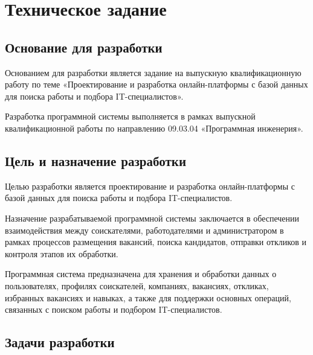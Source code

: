 \section{Техническое задание}
\subsection{Основание для разработки}

Основанием для разработки является задание на выпускную квалификационную работу по теме «Проектирование и разработка онлайн-платформы с базой данных для поиска работы и подбора IT-специалистов».

Разработка программной системы выполняется в рамках выпускной квалификационной работы по направлению 09.03.04 «Программная инженерия».

\subsection{Цель и назначение разработки}

Целью разработки является проектирование и разработка онлайн-платформы с базой данных для поиска работы и подбора IT-специалистов.

Назначение разрабатываемой программной системы заключается в обеспечении взаимодействия между соискателями, работодателями и администратором в рамках процессов размещения вакансий, поиска кандидатов, отправки откликов и контроля этапов их обработки.

Программная система предназначена для хранения и обработки данных о пользователях, профилях соискателей, компаниях, вакансиях, откликах, избранных вакансиях и навыках, а также для поддержки основных операций, связанных с поиском работы и подбором IT-специалистов.

\subsection{Задачи разработки}

